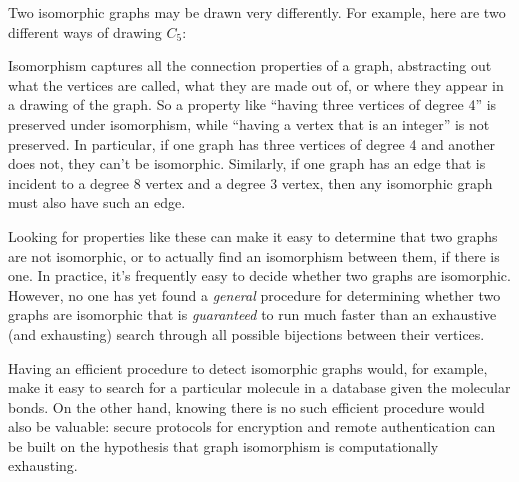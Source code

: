 Two isomorphic graphs may be drawn very differently.  For example, here
are two different ways of drawing $C_5$:


Isomorphism captures all the connection properties of a graph, abstracting
out what the vertices are called, what they are made out of, or where they
appear in a drawing of the graph.  So a property like ``having three
vertices of degree 4'' is preserved under isomorphism, while ``having a
vertex that is an integer'' is not preserved.  In particular, if one graph
has three vertices of degree 4 and another does not, they can't be
isomorphic.  Similarly, if one graph has an edge that is incident to
a degree 8 vertex and a degree 3 vertex, then any isomorphic graph must also
have such an edge.

Looking for properties like these can make it easy to determine that two
graphs are not isomorphic, or to actually find an isomorphism between
them, if there is one.  In practice, it's frequently easy to decide
whether two graphs are isomorphic.  However, no one has yet found a
\emph{general} procedure for determining whether two graphs are isomorphic
that is \emph{guaranteed} to run much faster than an exhaustive (and
exhausting) search through all possible bijections between their
vertices.

Having an efficient procedure to detect isomorphic graphs would, for
example, make it easy to search for a particular molecule in a database
given the molecular bonds.  On the other hand, knowing there is no such
efficient procedure would also be valuable: secure protocols for
encryption and remote authentication can be built on the hypothesis that
graph isomorphism is computationally exhausting.

\begin{problems}
\classproblems
{}

\homeworkproblems
{}

\examproblems
{}
\end{problems}



